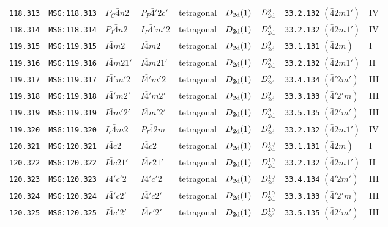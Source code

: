 \documentclass[fleqn,10pt]{jsarticle}
\begin{document}
\begin{center}
\begin{longtable}{lllllllll}
\texttt{118.313} & \texttt{MSG:118.313} & $P_{C}\bar{4}n2$ & $P_{P}\bar{4}'2c'$ & tetragonal & $D_{\rm 2d}(1)$ & $D_{\rm 2d}^{8}$ & \texttt{33.2.132} $(\bar{4}2m1')$ & IV \\
\texttt{118.314} & \texttt{MSG:118.314} & $P_{I}\bar{4}n2$ & $I_{P}\bar{4}'m'2$ & tetragonal & $D_{\rm 2d}(1)$ & $D_{\rm 2d}^{8}$ & \texttt{33.2.132} $(\bar{4}2m1')$ & IV \\ \hline
\texttt{119.315} & \texttt{MSG:119.315} & $I\bar{4}m2$ & $I\bar{4}m2$ & tetragonal & $D_{\rm 2d}(1)$ & $D_{\rm 2d}^{9}$ & \texttt{33.1.131} $(\bar{4}2m)$ & I \\
\texttt{119.316} & \texttt{MSG:119.316} & $I\bar{4}m21'$ & $I\bar{4}m21'$ & tetragonal & $D_{\rm 2d}(1)$ & $D_{\rm 2d}^{9}$ & \texttt{33.2.132} $(\bar{4}2m1')$ & II \\
\texttt{119.317} & \texttt{MSG:119.317} & $I\bar{4}'m'2$ & $I\bar{4}'m'2$ & tetragonal & $D_{\rm 2d}(1)$ & $D_{\rm 2d}^{9}$ & \texttt{33.4.134} $(\bar{4}'2m')$ & III \\
\texttt{119.318} & \texttt{MSG:119.318} & $I\bar{4}'m2'$ & $I\bar{4}'m2'$ & tetragonal & $D_{\rm 2d}(1)$ & $D_{\rm 2d}^{9}$ & \texttt{33.3.133} $(\bar{4}'2'm)$ & III \\
\texttt{119.319} & \texttt{MSG:119.319} & $I\bar{4}m'2'$ & $I\bar{4}m'2'$ & tetragonal & $D_{\rm 2d}(1)$ & $D_{\rm 2d}^{9}$ & \texttt{33.5.135} $(\bar{4}2'm')$ & III \\
\texttt{119.320} & \texttt{MSG:119.320} & $I_{c}\bar{4}m2$ & $P_{I}\bar{4}2m$ & tetragonal & $D_{\rm 2d}(1)$ & $D_{\rm 2d}^{9}$ & \texttt{33.2.132} $(\bar{4}2m1')$ & IV \\ \hline
\texttt{120.321} & \texttt{MSG:120.321} & $I\bar{4}c2$ & $I\bar{4}c2$ & tetragonal & $D_{\rm 2d}(1)$ & $D_{\rm 2d}^{10}$ & \texttt{33.1.131} $(\bar{4}2m)$ & I \\
\texttt{120.322} & \texttt{MSG:120.322} & $I\bar{4}c21'$ & $I\bar{4}c21'$ & tetragonal & $D_{\rm 2d}(1)$ & $D_{\rm 2d}^{10}$ & \texttt{33.2.132} $(\bar{4}2m1')$ & II \\
\texttt{120.323} & \texttt{MSG:120.323} & $I\bar{4}'c'2$ & $I\bar{4}'c'2$ & tetragonal & $D_{\rm 2d}(1)$ & $D_{\rm 2d}^{10}$ & \texttt{33.4.134} $(\bar{4}'2m')$ & III \\
\texttt{120.324} & \texttt{MSG:120.324} & $I\bar{4}'c2'$ & $I\bar{4}'c2'$ & tetragonal & $D_{\rm 2d}(1)$ & $D_{\rm 2d}^{10}$ & \texttt{33.3.133} $(\bar{4}'2'm)$ & III \\
\texttt{120.325} & \texttt{MSG:120.325} & $I\bar{4}c'2'$ & $I\bar{4}c'2'$ & tetragonal & $D_{\rm 2d}(1)$ & $D_{\rm 2d}^{10}$ & \texttt{33.5.135} $(\bar{4}2'm')$ & III \\

\end{longtable}
\end{center}
\end{document}
